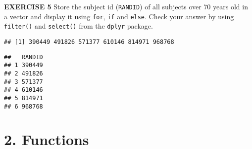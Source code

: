 \documentclass[
]{article}
\newenvironment{Shaded}{\begin{snugshade}}{\end{snugshade}}
\newcommand{\CommentTok}[1]{\textcolor[rgb]{0.56,0.35,0.01}{\textit{#1}}}
\newcommand{\ControlFlowTok}[1]{\textcolor[rgb]{0.13,0.29,0.53}{\textbf{#1}}}
\newcommand{\DataTypeTok}[1]{\textcolor[rgb]{0.13,0.29,0.53}{#1}}
\newcommand{\DecValTok}[1]{\textcolor[rgb]{0.00,0.00,0.81}{#1}}
\newcommand{\KeywordTok}[1]{\textcolor[rgb]{0.13,0.29,0.53}{\textbf{#1}}}
\newcommand{\NormalTok}[1]{#1}
\newcommand{\OperatorTok}[1]{\textcolor[rgb]{0.81,0.36,0.00}{\textbf{#1}}}
\newcommand{\StringTok}[1]{\textcolor[rgb]{0.31,0.60,0.02}{#1}}
\begin{document}
\textbf{EXERCISE 5} Store the subject id (\texttt{RANDID}) of all
subjects over 70 years old in a vector and display it using
\texttt{for}, \texttt{if} and \texttt{else}. Check your answer by using
\texttt{filter()} and \texttt{select()} from the \texttt{dplyr} package.

\begin{Shaded}
\end{Shaded}

\begin{verbatim}
## [1] 390449 491826 571377 610146 814971 968768
\end{verbatim}

\begin{Shaded}
\end{Shaded}

\begin{verbatim}
##   RANDID
## 1 390449
## 2 491826
## 3 571377
## 4 610146
## 5 814971
## 6 968768
\end{verbatim}

\hypertarget{functions}{%
\section{2. Functions}\label{functions}}
\end{document}
